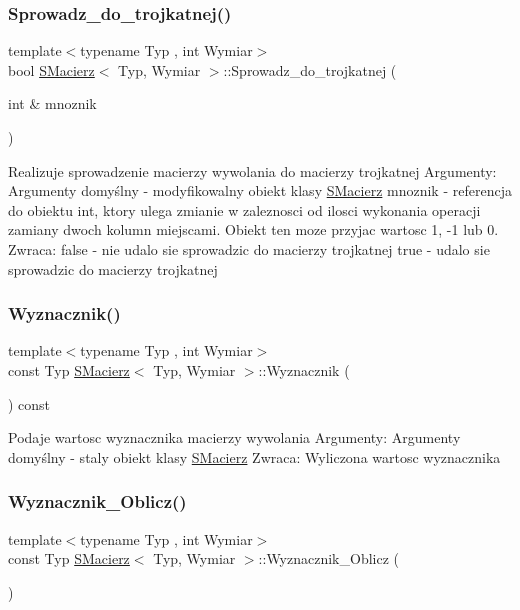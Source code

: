 \subsubsection{\texorpdfstring{Sprowadz\+\_\+do\+\_\+trojkatnej()}{Sprowadz\_do\_trojkatnej()}}
{\footnotesize\ttfamily template$<$typename Typ , int Wymiar$>$ \\
bool \hyperlink{classSMacierz}{S\+Macierz}$<$ Typ, Wymiar $>$\+::Sprowadz\+\_\+do\+\_\+trojkatnej (\begin{DoxyParamCaption}\item[{int \&}]{mnoznik }\end{DoxyParamCaption})\hspace{0.3cm}{\ttfamily [private]}}

Realizuje sprowadzenie macierzy wywolania do macierzy trojkatnej Argumenty\+: Argumenty domyślny -\/ modyfikowalny obiekt klasy \hyperlink{classSMacierz}{S\+Macierz} mnoznik -\/ referencja do obiektu int, ktory ulega zmianie w zaleznosci od ilosci wykonania operacji zamiany dwoch kolumn miejscami. Obiekt ten moze przyjac wartosc 1, -\/1 lub 0. Zwraca\+: false -\/ nie udalo sie sprowadzic do macierzy trojkatnej true -\/ udalo sie sprowadzic do macierzy trojkatnej \mbox{\label{classSMacierz_a1445d4e0c95d303e28d2f89e9751d77d}} 
\subsubsection{\texorpdfstring{Wyznacznik()}{Wyznacznik()}}
{\footnotesize\ttfamily template$<$typename Typ , int Wymiar$>$ \\
const Typ \hyperlink{classSMacierz}{S\+Macierz}$<$ Typ, Wymiar $>$\+::Wyznacznik (\begin{DoxyParamCaption}{ }\end{DoxyParamCaption}) const}

Podaje wartosc wyznacznika macierzy wywolania Argumenty\+: Argumenty domyślny -\/ staly obiekt klasy \hyperlink{classSMacierz}{S\+Macierz} Zwraca\+: Wyliczona wartosc wyznacznika \mbox{\label{classSMacierz_a89430b42ebd5e4b6a5bd65b91d2124ca}} 
\subsubsection{\texorpdfstring{Wyznacznik\+\_\+\+Oblicz()}{Wyznacznik\_Oblicz()}}
{\footnotesize\ttfamily template$<$typename Typ , int Wymiar$>$ \\
const Typ \hyperlink{classSMacierz}{S\+Macierz}$<$ Typ, Wymiar $>$\+::Wyznacznik\+\_\+\+Oblicz (\begin{DoxyParamCaption}{ }\end{DoxyParamCaption})\hspace{0.3cm}{\ttfamily [private]}}

